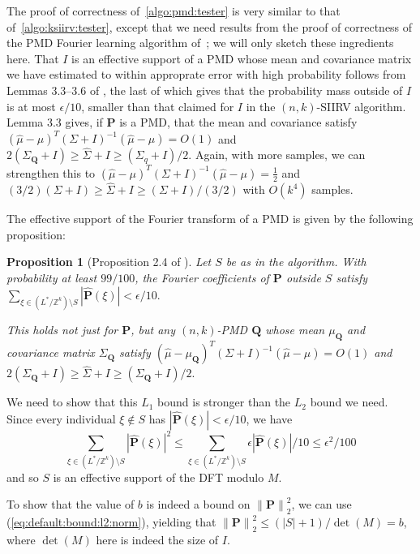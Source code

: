 \documentclass[11pt]{article}
\newtheorem{proposition}[theorem]{Proposition}
\theoremstyle{definition}
\newcommand{\Z}{\mathbb{Z}}
\newcommand{\p}{\mathbf{P}}
\newcommand{\q}{\mathbf{Q}}
\newcommand{\wh}[1]{{\fourier{#1}}}
\newcommand{\eps}{\epsilon}
\newcommand{\norm}[1]{\lVert#1\rVert}
\newcommand{\normtwo}[1]{{\norm{#1}}_2}
\newcommand{\fourier}[1]{\widehat{#1}}
\begin{document}
The proof of correctness of~\cref{algo:pmd:tester} is very similar to that of~\cref{algo:ksiirv:tester}, except that we need results from the proof of correctness of the PMD Fourier learning algorithm of~\cite{DKS15c}; we will only sketch these ingredients here. That $I$ is an effective support of a PMD whose mean and covariance matrix we have estimated to within approprate error with high probability follows from Lemmas 3.3--3.6 of \cite{DKS15c}, the last of which gives that the probability mass outside of $I$ is at most $\eps/10$, smaller than that claimed for $I$ in the $(n,k)$-SIIRV algorithm. Lemma 3.3 gives, if $\p$ is a PMD, that the mean and covariance satisfy $(\wh{\mu}-\mu)^T(\Sigma+I)^{-1}(\wh{\mu}-\mu) = O(1)$ and $2(\Sigma_\q+I) \geq \wh{\Sigma}+I \geq (\Sigma_q+I)/2.$ Again, with more samples, we can strengthen this to $(\wh{\mu}-\mu)^T(\Sigma+I)^{-1}(\wh{\mu}-\mu) = \frac{1}{2}$ and $(3/2)(\Sigma+I) \geq \wh{\Sigma}+I \geq (\Sigma+I)/(3/2)$ with $O(k^4)$ samples.

\noindent The effective support of the Fourier transform of a PMD is given by the following proposition:
\begin{proposition}[Proposition 2.4 of \cite{DKS15c}] \label{prop:ft-effective-support}
Let $S$ be as in the algorithm. With probability at least $99/100$, the Fourier coefficients of $\p$ outside $S$ satisfy
$\sum_{\xi \in (L^{\ast}/\Z^k)  \setminus S }|\wh{\p}(\xi)| < \eps/10.$

This holds not just for $\p$, but any $(n,k)$-PMD $\q$ whose mean $\mu_\q$ and covariance matrix $\Sigma_\q$ satisfy $(\wh{\mu}-\mu_\q)^T(\Sigma+I)^{-1}(\wh{\mu}-\mu) = O(1)$ and $2(\Sigma_\q+I) \geq \wh{\Sigma}+I \geq (\Sigma_\q+I)/2.$
\end{proposition}

We need to show that this $L_1$ bound is stronger than the $L_2$ bound we need. Since every individual $\xi \notin S$ has $|\wh{\p}(\xi)| < \eps/10$, we have
$$\sum_{\xi \in (L^{\ast}/\Z^k)  \setminus S }|\wh{\p}(\xi)|^2 \leq \sum_{\xi \in (L^{\ast}/\Z^k)  \setminus S } \eps |\wh{\p}(\xi)|/10 \leq \eps^2/100$$
and so $S$ is an effective support of the DFT modulo $M$.


To show that the value of $b$ is indeed a bound on $\normtwo{\p}^2$, we can use (\ref{eq:default:bound:l2:norm}), yielding that $\normtwo{\p}^2 \leq (|S|+1)/\det(M) = b $, where $\det(M)$ here is indeed the size of $I$.
\end{document}
